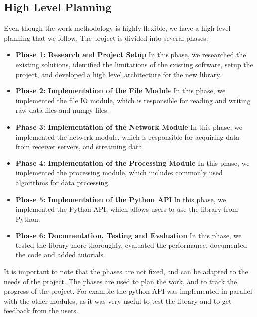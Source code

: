 \begin{spacing}{1.2}
    \section{High Level Planning}
    Even though the work methodology is highly flexible, we have a high level planning that we follow.
    The project is divided into several phases:
    \begin{itemize}
        \item \textbf{Phase 1: Research and Project Setup} In this phase, we researched the existing solutions, identified the limitations of the existing software,
              setup the project, and developed a high level architecture for the new library.
        \item \textbf{Phase 2: Implementation of the File Module} In this phase, we implemented the file IO module, which is responsible for reading and writing raw data files and numpy files.
        \item \textbf{Phase 3: Implementation of the Network Module} In this phase, we implemented the network module, which is responsible for acquiring data from receiver servers, and streaming data.
        \item \textbf{Phase 4: Implementation of the Processing Module} In this phase, we implemented the processing module, which includes commonly used algorithms for data processing.
        \item \textbf{Phase 5: Implementation of the Python API} In this phase, we implemented the Python API, which allows users to use the library from Python.
        \item \textbf{Phase 6: Documentation, Testing and Evaluation} In this phase, we tested the library more thoroughly, evaluated the performance, documented the code and added tutorials.
    \end{itemize}

    It is important to note that the phases are not fixed, and can be adapted to the needs of the project. The phases are used to plan the work, and to track the progress of the project.
    For example the python API was implemented in parallel with the other modules, as it was very useful to test the library and to get feedback from the users.


\end{spacing}
